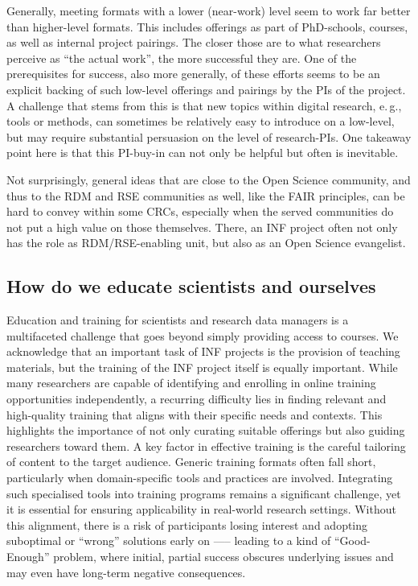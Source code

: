 \documentclass{eceasst}
\newcommand{\eg}{e.\,g.}
\begin{document}
Generally, meeting formats with a lower (near-work) level seem to work far better than higher-level formats.
This includes offerings as part of PhD-schools, courses, as well as internal project pairings.
The closer those are to what researchers perceive as “the actual work”, the more successful they are.
One of the prerequisites for success, also more generally,
of these efforts seems to be an explicit backing of such low-level offerings and pairings by the PIs of the project.
A challenge that stems from this is that new topics within digital research, \eg, tools or methods, can sometimes be relatively easy to introduce on a low-level, but may require substantial persuasion on the level of research-PIs.
One takeaway point here is that this PI-buy-in can not only be helpful but often is inevitable.

Not surprisingly, general ideas that are close to the Open Science community, and thus to the RDM and RSE communities as well, like the FAIR principles,
can be hard to convey within some CRCs, especially when the served communities do not put a high value on those themselves.
There, an INF project often not only has the role as RDM/RSE-enabling unit, but also as an Open Science evangelist.

\subsection{How do we educate scientists and ourselves}
Education and training for scientists and research data managers is a multifaceted challenge that goes beyond simply providing access to courses.
We acknowledge that an important task of INF projects is the provision of teaching materials, but the training of the INF project itself is equally important.
While many researchers are capable of identifying and enrolling in online training opportunities independently, a recurring difficulty lies in finding relevant and high-quality training that aligns with their specific needs and contexts.
This highlights the importance of not only curating suitable offerings but also guiding researchers toward them.
A key factor in effective training is the careful tailoring of content to the target audience.
Generic training formats often fall short, particularly when domain-specific tools and practices are involved.
Integrating such specialised tools into training programs remains a significant challenge,
yet it is essential for ensuring applicability in real-world research settings.
Without this alignment, there is a risk of participants losing interest and adopting suboptimal or “wrong” solutions early on —-- leading to a kind of ``Good-Enough'' problem,
where initial, partial success obscures underlying issues and may even have long-term negative consequences.
\end{document}
